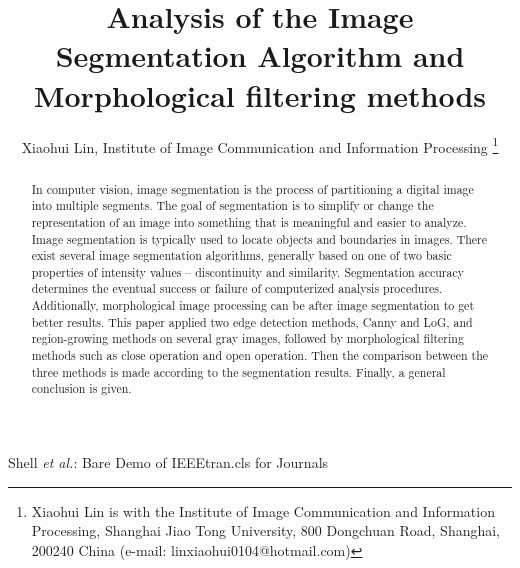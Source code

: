 \documentclass[journal]{IEEEtran}
\begin{document}
%
\title{Analysis of the Image Segmentation Algorithm and Morphological filtering methods}
%
%


\author{Xiaohui Lin, Institute of Image Communication and Information Processing%
\thanks{Xiaohui Lin is with the Institute of Image Communication and Information Processing, Shanghai Jiao Tong University, 800 Dongchuan Road, Shanghai,
200240 China (e-mail: linxiaohui0104@hotmail.com)}}



%
{Shell \MakeLowercase{\textit{et al.}}: Bare Demo of IEEEtran.cls for Journals}
%






\maketitle


\begin{abstract}
In computer vision, image segmentation is the process of  partitioning a digital image into multiple segments. The goal of segmentation is to simplify or change the representation of an image into something that is meaningful and easier to analyze. Image segmentation is typically used to locate objects and boundaries in images. There exist several image segmentation algorithms, generally based on one of two basic properties of intensity values -- discontinuity and similarity. Segmentation accuracy determines the eventual success or failure of computerized analysis procedures. Additionally, morphological image processing can be after image segmentation to get better results. This paper applied two edge detection methods, Canny and LoG, and region-growing methods on several gray images, followed by morphological filtering methods such as close operation and open operation. Then the comparison between the three methods is made according to the segmentation results. Finally, a general conclusion is given.

\end{abstract}
\end{document}

